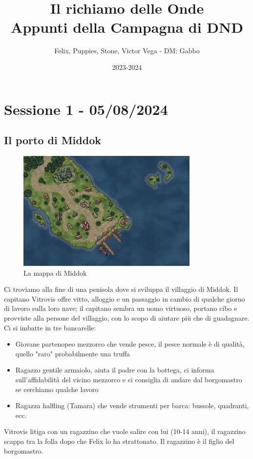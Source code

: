 \documentclass[letterpaper,twocolumn,openany,justified,nodeprecatedcode]{dndbook}
\title{Il richiamo delle Onde \\
\large Appunti della Campagna di DND}
\author{Felix, Puppies, Stone, Victor Vega - DM: Gabbo}
\date{2023-2024}
\begin{document}
\frontmatter

\maketitle

\tableofcontents


\mainmatter%

\chapter*{Sessione 1 - 05/08/2024}
\section{Il porto di Middok}
\begin{figure}
\centering
\includegraphics[width=9cm]{./mappe/mappa-middok.png}
\caption{La mappa di Middok}
\label{middok}
\end{figure}


Ci troviamo alla fine di una penisola dove si sviluppa il villaggio di Middok.
Il capitano Vitrovis offre vitto, alloggio e un passaggio in cambio di qualche giorno di lavoro sulla loro nave; il capitano sembra un uomo virtuoso, portano cibo e provviste alla persone del villaggio, con lo scopo di aiutare più che di guadagnare.
Ci si imbatte in tre bancarelle:
\begin{itemize}
  \item Giovane partenopeo mezzorco che vende pesce, il pesce normale è di qualità, quello "raro" probabilmente una truffa
  \item Ragazzo gentile armaiolo, aiuta il padre con la bottega, ci informa sull'affidabilità del vicino mezzorco e ci consiglia di andare dal borgomastro se cerchiamo qualche lavoro
  \item Ragazza halfling (Tamara) che vende strumenti per barca: bussole, quadranti, ecc.
\end{itemize}
Vitrovis litiga con un ragazzino che vuole salire con lui (10-14 anni), il ragazzino scappa tra la folla dopo che Felix lo ha strattonato. Il ragazzino è il figlio del borgomastro.
\end{document}
